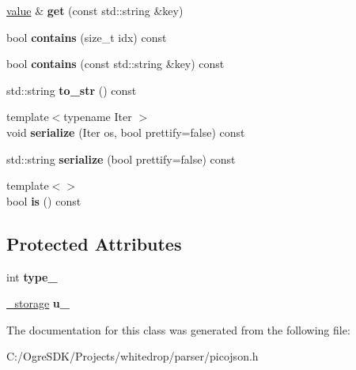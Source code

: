 \begin{DoxyCompactItemize}
\item 
\hypertarget{classpicojson_1_1value_a72f3216a2536e4e088e70b0f1617fc11}{\hyperlink{classpicojson_1_1value}{value} \& {\bfseries get} (const std\+::string \&key)}\label{classpicojson_1_1value_a72f3216a2536e4e088e70b0f1617fc11}

\item 
\hypertarget{classpicojson_1_1value_a60efde50d8b780998ea663b0239c6c46}{bool {\bfseries contains} (size\+\_\+t idx) const }\label{classpicojson_1_1value_a60efde50d8b780998ea663b0239c6c46}

\item 
\hypertarget{classpicojson_1_1value_a14dbd110c8820a94ad4212e3a6b8e95b}{bool {\bfseries contains} (const std\+::string \&key) const }\label{classpicojson_1_1value_a14dbd110c8820a94ad4212e3a6b8e95b}

\item 
\hypertarget{classpicojson_1_1value_aca8f960de0545ae8189189109da47a35}{std\+::string {\bfseries to\+\_\+str} () const }\label{classpicojson_1_1value_aca8f960de0545ae8189189109da47a35}

\item 
\hypertarget{classpicojson_1_1value_ac8bb969874ca0be885ef700e83d618da}{{\footnotesize template$<$typename Iter $>$ }\\void {\bfseries serialize} (Iter os, bool prettify=false) const }\label{classpicojson_1_1value_ac8bb969874ca0be885ef700e83d618da}

\item 
\hypertarget{classpicojson_1_1value_a2883e16479d3bc24a78bc8bac991053a}{std\+::string {\bfseries serialize} (bool prettify=false) const }\label{classpicojson_1_1value_a2883e16479d3bc24a78bc8bac991053a}

\item 
\hypertarget{classpicojson_1_1value_aebcdc3a8a32242e72c6e8f163d4f2f36}{{\footnotesize template$<$$>$ }\\bool {\bfseries is} () const }\label{classpicojson_1_1value_aebcdc3a8a32242e72c6e8f163d4f2f36}

\end{DoxyCompactItemize}
\subsection*{Protected Attributes}
\begin{DoxyCompactItemize}
\item 
\hypertarget{classpicojson_1_1value_af77ae4525a20f6fce6ea9ff1c4709312}{int {\bfseries type\+\_\+}}\label{classpicojson_1_1value_af77ae4525a20f6fce6ea9ff1c4709312}

\item 
\hypertarget{classpicojson_1_1value_aa7948fe10fcbc19ab9c8dee5e5099f77}{\hyperlink{unionpicojson_1_1value_1_1__storage}{\+\_\+storage} {\bfseries u\+\_\+}}\label{classpicojson_1_1value_aa7948fe10fcbc19ab9c8dee5e5099f77}

\end{DoxyCompactItemize}


The documentation for this class was generated from the following file\+:\begin{DoxyCompactItemize}
\item 
C\+:/\+Ogre\+S\+D\+K/\+Projects/whitedrop/parser/picojson.\+h\end{DoxyCompactItemize}
